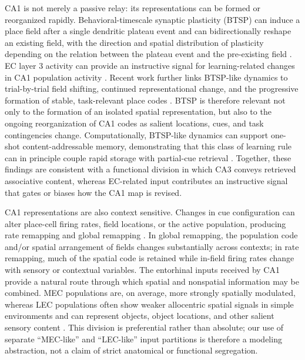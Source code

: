 CA1 is not merely a passive relay: its representations can be formed or reorganized rapidly.
Behavioral-timescale synaptic plasticity (BTSP) can induce a place field after a single dendritic plateau event and can bidirectionally reshape an existing field, with the direction and spatial distribution of plasticity depending on the relation between the plateau event and the pre-existing field \citep{bittner2017,milstein2021}.
EC layer 3 activity can provide an instructive signal for learning-related changes in CA1 population activity \citep{grienberger2022}.
Recent work further links BTSP-like dynamics to trial-by-trial field shifting, continued representational change, and the progressive formation of stable, task-relevant place codes \citep{madar2025,vaidya2025}.
BTSP is therefore relevant not only to the formation of an isolated spatial representation, but also to the ongoing reorganization of CA1 codes as salient locations, cues, and task contingencies change.
Computationally, BTSP-like dynamics can support one-shot content-addressable memory, demonstrating that this class of learning rule can in principle couple rapid storage with partial-cue retrieval \citep{wu2025}.
Together, these findings are consistent with a functional division in which CA3 conveys retrieved associative content, whereas EC-related input contributes an instructive signal that gates or biases how the CA1 map is revised.

CA1 representations are also context sensitive.
Changes in cue configuration can alter place-cell firing rates, field locations, or the active population, producing rate remapping and global remapping \citep{muller1987,leutgeb2005}.
In global remapping, the population code and/or spatial arrangement of fields changes substantially across contexts; in rate remapping, much of the spatial code is retained while in-field firing rates change with sensory or contextual variables.
The entorhinal inputs received by CA1 provide a natural route through which spatial and nonspatial information may be combined.
MEC populations are, on average, more strongly spatially modulated, whereas LEC populations often show weaker allocentric spatial signals in simple environments and can represent objects, object locations, and other salient sensory content \citep{hargreaves2005,deshmukh2011,henriksen2010}.
This division is preferential rather than absolute; our use of separate ``MEC-like'' and ``LEC-like'' input partitions is therefore a modeling abstraction, not a claim of strict anatomical or functional segregation.

